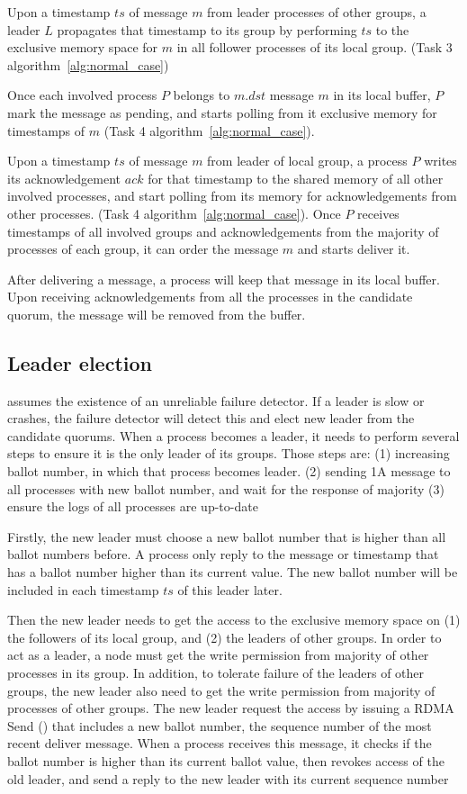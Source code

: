Upon \lread a timestamp $ts$ of message $m$ from leader processes of other
groups, a leader $L$ propagates that timestamp to its group by performing
\rwrite $ts$ to the exclusive memory space for $m$ in all follower processes of
its local group. (Task 3 algorithm~\ref{alg:normal_case})

Once each involved process $P$ belongs to $m.dst$ \lread message $m$ in its
local buffer, $P$ mark the message as pending, and starts polling from it
exclusive memory for timestamps of $m$ (Task 4 algorithm~\ref{alg:normal_case}).

Upon \lread a timestamp $ts$ of message $m$ from leader of local group, a
process $P$ writes its acknowledgement $ack$ for that timestamp to the shared
memory of all other involved processes, and start polling from its memory for
acknowledgements from other processes. (Task 4 algorithm~\ref{alg:normal_case}).
Once $P$ receives timestamps of all involved groups and acknowledgements from
the majority of processes of each group, it can order the message $m$ and starts
deliver it.

After delivering a message, a process will keep that message in its local buffer.
Upon receiving acknowledgements from all the processes in the candidate
quorum, the message will be removed from the buffer.

\subsection{Leader election}

\libname assumes the existence of an unreliable failure detector. If a leader is
slow or crashes, the failure detector will detect this and elect new leader from
the candidate quorums. When a process becomes a leader, it needs to perform
several steps to ensure it is the only leader of its groups. Those steps are:
(1) increasing ballot number, in which that process becomes leader. (2) sending
1A message to all processes with new ballot number, and wait for the response of
majority (3) ensure the logs of all processes are up-to-date

Firstly, the new leader must choose a new ballot number that is higher than all
ballot numbers before. A process only reply to the message or timestamp that has
a ballot number higher than its current value. The new ballot number will be
included in each timestamp $ts$ of this leader later.

Then the new leader needs to get the access to the exclusive memory space on (1)
the followers of its local group, and (2) the leaders of other groups. In order
to act as a leader, a node must get the write permission from majority of other
processes in its group. In addition, to tolerate failure of the leaders of other
groups, the new leader also need to get the write permission from majority of
processes of other groups. The new leader request the access by issuing a RDMA
Send () that includes a new ballot number, the
sequence number of the most recent deliver message. When a process receives this
message, it checks if the ballot number is higher than its current ballot value,
then revokes access of the old leader, and send a reply to the new leader with
its current sequence number

